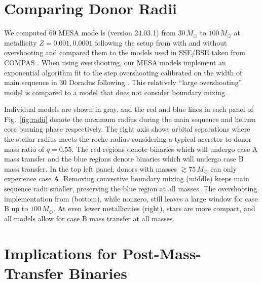 \documentclass[twocolumn]{aastex63}
\DeclareRobustCommand{\Figref}[1]{Fig.~\ref{#1}}
\begin{document}
\section{Comparing Donor Radii}

We computed 60 MESA mode ls (version 24.03.1) from $30 \, M_{\odot}$
to $100 \, M_{\odot}$ at metallicity $Z=0.001,0.0001$ following the
setup from \cite{renzo:23} with and without overshooting and compared
them to the \cite{pols:98} models used in SSE/BSE \cite{hurley:00}
taken from COMPAS \cite{stevenson:17, vignagomez:18, riley:22}. When
using overshooting, our MESA models implement an exponential algorithm
\citep{herwig:00} fit to the step overshooting calibrated on the width
of main sequence in 30 Doradus \citep{brott:11} following
\cite{claret:18}. This relatively ``large overshooting'' model is
compared to a model that does not consider boundary mixing.

Individual models are shown in gray, and the red and blue lines in
each panel of \Figref{fig:radii} denote the maximum radius during
the main sequence and helium core burning phase respectively. The
right axis shows orbital separations where the stellar radius meets
the roche radius \citep{eggleton:83} considering a typical
accretor-to-donor mass ratio of $q=0.55$. The red regions denote
binaries which will undergo case A mass transfer and the blue regions
denote binaries which will undergo case B mass transfer. In the top
left panel, donors with masses $ \gtrsim 75 \, M_{\odot}$ can only
experience case A. Removing convective boundary mixing (middle) keeps
main sequence radii smaller, preserving the blue region at all
masses. The overshooting implementation from \cite{pols:98} (bottom),
while nonzero, still leaves a large window for case B up to
$100 \, M_{\odot}$. At even lower metallicities (right), stars are
more compact, and all models allow for case B mass transfer at all
masses.

\section{Implications for Post-Mass-Transfer Binaries}
\end{document}
